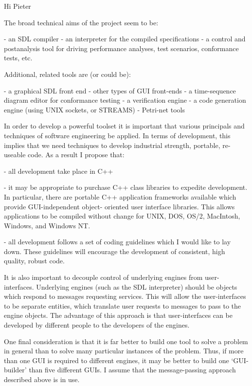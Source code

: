 Hi Pieter

The broad technical aims of the project seem to be:

  - an SDL compiler
  - an interpreter for the compiled specifications
  - a control and postanalysis tool for driving performance analyses,
	test scenarios, conformance tests, etc.

Additional, related tools are (or could be):

  - a graphical SDL front end
  - other types of GUI front-ends
  - a time-sequence diagram editor for conformance testing
  - a verification engine
  - a code generation engine (using UNIX sockets, or STREAMS)
  - Petri-net tools

In order to develop a powerful toolset it is important that 
various principals and techniques of software engineering be
applied. In terms of development, this implies that we need
techniques to develop industrial strength, portable, re-useable
code. As a result I propose that:

  - all development take place in C++

  - it may be appropriate to purchase C++ class libraries to expedite
	development. In particular, there are portable C++ application
	frameworks available which provide GUI-independent object-
	oriented user interface libraries. This allows applications to
	be compiled without change for UNIX, DOS, OS/2, MacIntosh, 
	Windows, and Windows NT.

  - all development follows a set of coding guidelines which I
	would like to lay down. These guidelines will encourage the
	development of consistent, high quality, robust code.

It is also important to decouple control of underlying engines
from user-interfaces. Underlying engines (such as the SDL interpreter)
should be objects which respond to messages requesting services.
This will allow the user-interfaces to be separate entities, which
translate user requests to messages to pass to the engine objects.
The advantage of this approach is that user-interfaces can be 
developed by different people to the developers of the engines.

One final consideration is that it is far better to build one 
tool to solve a problem in general than to solve many particular
instances of the problem. Thus, if more than one GUI is required
to different engines, it may be better to build one `GUI-builder'
than five different GUIs. I assume that the message-passing approach
described above is in use.

